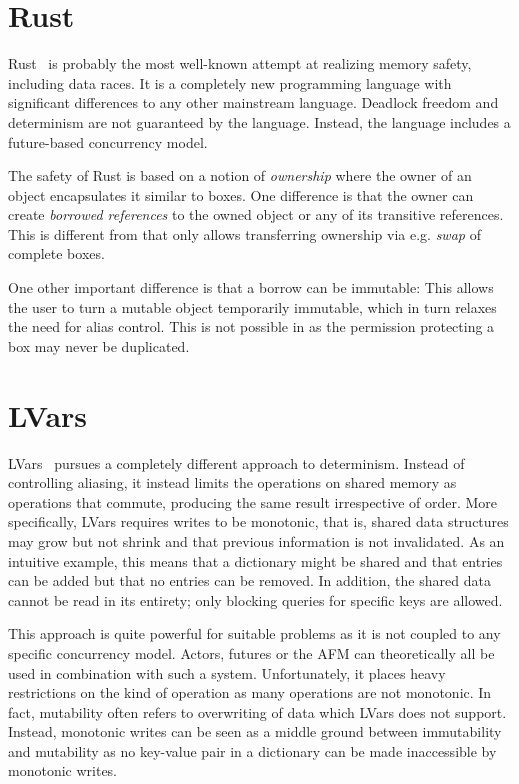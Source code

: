 \section{Rust}
Rust~\cite{matsakis_rust_2014} is probably the most well-known attempt at realizing memory safety, including data races. It is a completely new programming language with significant differences to any other mainstream language. Deadlock freedom and determinism are not guaranteed by the language. Instead, the language includes a future-based concurrency model.

The safety of Rust is based on a notion of \textit{ownership} where the owner of an object encapsulates it similar to boxes. One difference is that the owner can create \textit{borrowed references} to the owned object or any of its transitive references. This is different from \plc that only allows transferring ownership via e.g. \textit{swap} of complete boxes.

One other important difference is that a borrow can be immutable: This allows the user to turn a mutable object temporarily immutable, which in turn relaxes the need for alias control. This is not possible in \plc as the permission protecting a box may never be duplicated.

\section{LVars}
LVars~\cite{kuper_lvars_2013} pursues a completely different approach to determinism. Instead of controlling aliasing, it instead limits the operations on shared memory as operations that commute, producing the same result irrespective of order. More specifically, LVars requires writes to be monotonic, that is, shared data structures may grow but not shrink and that previous information is not invalidated. As an intuitive example, this means that a dictionary might be shared and that entries can be added but that no entries can be removed. In addition, the shared data cannot be read in its entirety; only blocking queries for specific keys are allowed.

This approach is quite powerful for suitable problems as it is not coupled to any specific concurrency model. Actors, futures or the AFM can theoretically all be used in combination with such a system. Unfortunately, it places heavy restrictions on the kind of operation as many operations are not monotonic. In fact, mutability often refers to overwriting of data which LVars does not support. Instead, monotonic writes can be seen as a middle ground between immutability and mutability as no key-value pair in a dictionary can be made inaccessible by monotonic writes.

